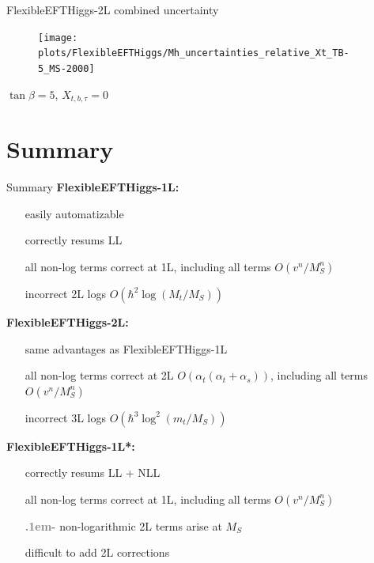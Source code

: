 \documentclass[hyperref={pdfpagelabels=false},ngerman]{beamer}
\newcommand{\cmark}{\ding{51}}%
\newcommand{\xmark}{\ding{55}}%
\newcommand{\ok}{\textcolor{darkgreen}{\cmark}}
\newcommand{\notok}{\textcolor{red}{\xmark}}
\newcommand{\meh}{\textcolor{gray}{\textbf{\huge\lower.1em\hbox{-}}}}
\renewcommand{\emph}{\textbf}
\newcommand{\fsstar}{\textbf{*}}
\begin{document}
\begin{frame}{FlexibleEFTHiggs-2L combined uncertainty}
  \begin{figure}
    \centering
    \texttt{[image: plots/FlexibleEFTHiggs/Mh\_uncertainties\_relative\_Xt\_TB-5\_MS-2000]}
  \end{figure}
  $\tan\beta = 5$, $X_{t,b,\tau} = 0$
\end{frame}


\section{Summary}

\begin{frame}{Summary}
  \emph{FlexibleEFTHiggs-1L:}\\
  \begin{itemize}
  \item[\ok] easily automatizable
  \item[\ok] correctly resums LL
  \item[\ok] all non-log terms correct at 1L, including all terms $O(v^n/M_S^n)$
  \item[\notok] incorrect 2L logs $O(\hbar^2 \log(M_t/M_S))$
  \end{itemize}
  \emph{FlexibleEFTHiggs-2L:}
  \begin{itemize}
  \item[\ok] same advantages as FlexibleEFTHiggs-1L
  \item[\ok] all non-log terms correct at 2L $O(\alpha_t(\alpha_t +
    \alpha_s))$, including all terms $O(v^n/M_S^n)$
  \item[\notok] incorrect 3L logs $O(\hbar^3 \log^2(m_t/M_S))$
  \end{itemize}
  \emph{FlexibleEFTHiggs-1L\fsstar:}
  \begin{itemize}
  \item[\ok] correctly resums LL + NLL
  \item[\ok] all non-log terms correct at 1L, including all terms $O(v^n/M_S^n)$
  \item[\meh] non-logarithmic 2L terms arise at $M_S$
  \item[\notok] difficult to add 2L corrections
  \end{itemize}
\end{frame}

\end{document}
